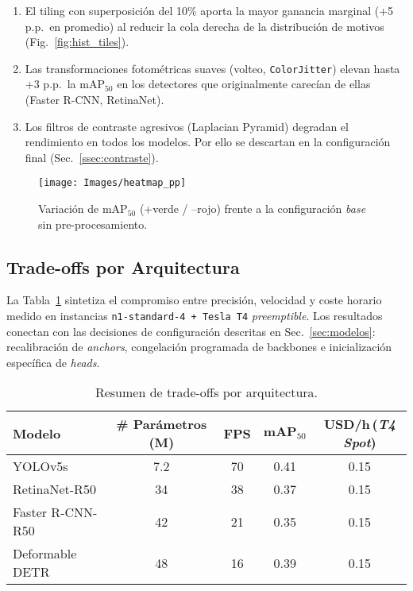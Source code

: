 \begin{enumerate}
  \item El tiling con superposición del 10\% aporta la mayor ganancia marginal (+5 p.p.\ en promedio) al reducir la cola derecha de la distribución de motivos (Fig.~\ref{fig:hist_tiles}).
  \item Las transformaciones fotométricas suaves (volteo, \texttt{ColorJitter}) elevan hasta +3 p.p.\ la \(\text{mAP}_{50}\) en los detectores que originalmente carecían de ellas (Faster R-CNN, RetinaNet).
  \item Los filtros de contraste agresivos (Laplacian Pyramid) degradan el rendimiento en todos los modelos.
  Por ello se descartan en la configuración final (Sec.~\ref{ssec:contraste}).
\end{enumerate}

\begin{figure}[!h]
  \centering
  \texttt{[image: Images/heatmap\_pp]}
  \caption{Variación de \(\text{mAP}_{50}\) (+verde / –rojo) frente a la configuración \emph{base} sin pre-procesamiento.}
  \label{fig:heatmap_pp}
\end{figure}

\subsection{Trade-offs por Arquitectura}

La Tabla~\ref{tab:tradeoff} sintetiza el compromiso entre precisión, velocidad y coste horario medido en instancias \texttt{n1-standard-4 + Tesla T4} \emph{preemptible}.
Los resultados conectan con las decisiones de configuración descritas en Sec.~\ref{sec:modelos}: recalibración de \emph{anchors}, congelación programada de backbones e inicialización específica de \emph{heads}.

\begin{table}[!h]
\centering
\caption{Resumen de trade-offs por arquitectura.}
\label{tab:tradeoff}
\begin{tabular}{|l|c|c|c|c|}
\hline
\textbf{Modelo} & \textbf{\# Parámetros (M)} & \textbf{FPS} & \(\textbf{mAP}_{50}\) & \textbf{USD/h}\footnotesize{\,(\textit{T4 Spot})} \\ \hline
YOLOv5s          & 7.2  & 70 & 0.41 & 0.15 \\ \hline
RetinaNet-R50    & 34   & 38 & 0.37 & 0.15 \\ \hline
Faster R-CNN-R50 & 42   & 21 & 0.35 & 0.15 \\ \hline
Deformable DETR  & 48   & 16 & 0.39 & 0.15 \\ \hline
\end{tabular}
\end{table}

